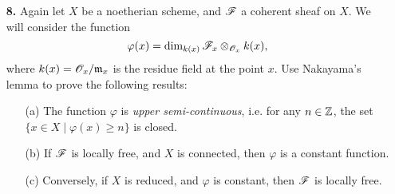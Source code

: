\documentclass{article}
\begin{document}
\begin{enumerate} [label=\textbf{\arabic*.}, leftmargin=0em]
\begin{proof}
\begin{itemize}[leftmargin=0em]
        \item[(b)] The if direction follows from (a). The converse direction follows from the following facts: we can realize finite free modules as a colimit, the stalk of a sheaf is defined as a colimit, and colimits commute.

        \item[(c)] By the previous parts and lemma 2, we reduce to the following algebraic problem: let $A$ be a noetherian local ring with maximal ideal $\goth{m}$, and let $M$ be a finitely generated $A$-module. Then $M \cong A$ if and only if there exists a finitely generated $A$-module $N$ such that $M \otimes_A N \cong A$. One direction is clear. Conversely, suppose $M, N$ are finitely generated $A$-modules such that $M \otimes_A N \cong A$. Let $k = A / \goth{m}$ be the residue field of $A$. Tensoring with $k$ gives
        \begin{equation*}
            (M \otimes_A k) \otimes_k (N \otimes_A k) \cong (M \otimes_A N) \otimes_A k \cong A \otimes_A k \cong k,
        \end{equation*}
        which implies $M \otimes_A k \cong k$. By Nakayama's lemma, $M$ is generated by a single element, which implies $M \cong A / \goth{a}$ for some ideal $\goth{a}$ of $A$, and similarly $N = A / \goth{b}$. We have $$A \cong M \otimes_A N \cong A / \goth{a} \otimes_A A / \goth{b} \cong A / (\goth{a} + \goth{b}),$$
        which implies $\goth{a} + \goth{b} = (0)$. Hence, $M, N \cong A$.
    \end{itemize}
\end{proof}

\item[\textbf{8.}] Again let $X$ be a noetherian scheme, and $\mathscr{F}$ a coherent sheaf on $X$. We will consider the function
\begin{equation*}
    \varphi(x) = \dim_{k(x)}\mathscr{F}_x \otimes_{\mathscr{O}_x} k(x),
\end{equation*}
where $k(x) = \mathscr{O}_x / \mathfrak{m}_x$ is the residue field at the point $x$. Use Nakayama's lemma to prove the following results:
\begin{itemize}
    \item[(a)] The function $\varphi$ is \textit{upper semi-continuous}, i.e. for any $n \in \mathbb{Z}$, the set $\{ x \in X \mid \varphi(x) \geq n\}$ is closed.
    \item[(b)] If $\mathscr{F}$ is locally free, and $X$ is connected, then $\varphi$ is a constant function.
    \item[(c)] Conversely, if $X$ is reduced, and $\varphi$ is constant, then $\mathscr{F}$ is locally free.
\end{itemize}


\end{enumerate}
\end{document}
